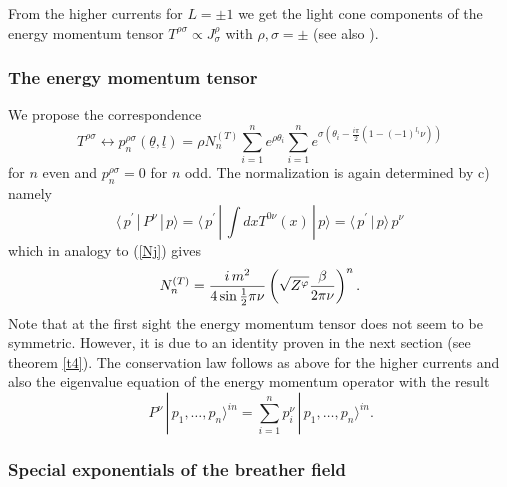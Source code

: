 \documentclass[a4paper,a4paper]{article}
\begin{document}
From the higher currents for $L=\pm 1$ we get the light cone components of
the energy momentum tensor $T^{\rho \sigma }\varpropto J_{\sigma }^{\rho }$
with $\rho ,\sigma =\pm $ (see also \cite{MS}).

\subsubsection{The energy momentum tensor}

We propose the correspondence 
\begin{equation}
T^{\rho \sigma }\leftrightarrow p_{n}^{\rho \sigma }(\underline{\theta },%
\underline{l})=\rho N_{n}^{(T)}\sum\limits_{i=1}^{n}e^{\rho \theta
_{i}}\sum\limits_{i=1}^{n}e^{\sigma \left( \theta _{i}-\frac{i\pi }{2}%
(1-(-1)^{l_{i}}\nu )\right) }  \label{p4}
\end{equation}
for $n$ even and $p_{n}^{\rho \sigma }=0$ for $n$ odd. The normalization is
again determined by c) namely 
\begin{equation}
\langle \,p^{\prime }\,|\,P^{\nu }\,|\,p\rangle =\langle \,p^{\prime
}\,|\,\int dxT^{0\nu }(x)\,|\,p\rangle =\langle \,p^{\prime }\,|\,p\rangle
\,p^{\nu }  \label{Nt}
\end{equation}
which in analogy to (\ref{Nj}) gives 
\begin{equation}
N_{n}^{(T)}=\frac{i\,m^{2}}{4\sin \tfrac{1}{2}\pi \nu }\left( \sqrt{%
Z^{\varphi }}\frac{\beta }{2\pi \nu }\right) ^{n}.  \label{4.4}
\end{equation}
Note that at the first sight the energy momentum tensor does not seem to be
symmetric. However, it is due to an identity proven in the next section (see
theorem \ref{t4}). The conservation law follows as above for the higher
currents and also the eigenvalue equation of the energy momentum operator
with the result 
\[
\,P^{\nu }\,|\,p_{1},\dots ,p_{n}\rangle ^{in}=\sum_{i=1}^{n}p_{i}^{\nu
}\,|\,p_{1},\dots ,p_{n}\rangle ^{in}. 
\]

\subsubsection{Special exponentials of the breather field}
\end{document}
